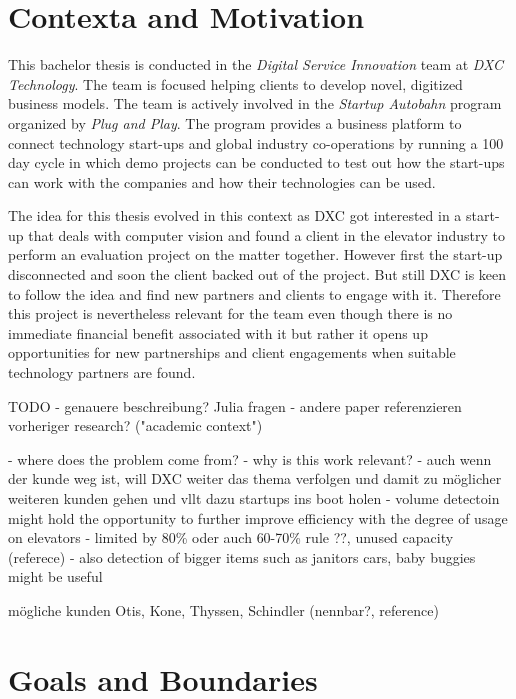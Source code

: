 \section{Contexta and Motivation}

This bachelor thesis is conducted in the \emph{Digital Service Innovation} team at \emph{DXC Technology}.
The team is focused helping clients to develop novel, digitized business models.
The team is actively involved in the \emph{Startup Autobahn} program organized by \emph{Plug and Play}.
The program provides a business platform to connect technology start-ups and global industry co-operations 
by running a 100 day cycle in which demo projects can be conducted to test out how the start-ups can work with the companies and how their technologies can be used.

The idea for this thesis evolved in this context as DXC got interested in a start-up that deals with computer vision and found a client in the elevator industry to perform an evaluation project on the matter together.
However first the start-up disconnected and soon the client backed out of the project.
But still DXC is keen to follow the idea and find new partners and clients to engage with it.
Therefore this project is nevertheless relevant for the team even though there is no immediate financial benefit associated with it 
but rather it opens up opportunities for new partnerships and client engagements when suitable technology partners are found.




TODO
- genauere beschreibung? Julia fragen
- andere paper referenzieren vorheriger research? ("academic context")

- where does the problem come from?
- why is this work relevant?
- auch wenn der kunde weg ist, will DXC weiter das thema verfolgen und damit zu möglicher weiteren kunden gehen und vllt dazu startups ins boot holen
- volume detectoin might hold the opportunity to further improve efficiency with the degree of usage on elevators
- limited by 80\% oder auch 60-70\% rule ??, unused capacity (referece)
- also detection of bigger items such as janitors cars, baby buggies  might be useful


mögliche kunden Otis, Kone, Thyssen, Schindler (nennbar?, reference)

\section{Goals and Boundaries}

